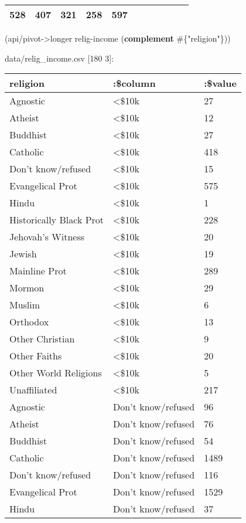 \documentclass[]{article}
\newenvironment{Shaded}{\begin{snugshade}}{\end{snugshade}}
\newcommand{\KeywordTok}[1]{\textcolor[rgb]{0.13,0.29,0.53}{\textbf{#1}}}
\newcommand{\StringTok}[1]{\textcolor[rgb]{0.31,0.60,0.02}{#1}}
\newcommand{\NormalTok}[1]{#1}
\begin{document}
\begin{longtable}[]{@{}lllllllllll@{}}
\begin{minipage}[t]{0.05\columnwidth}
528\strut
\end{minipage} & \begin{minipage}[t]{0.06\columnwidth}\raggedright\strut
407\strut
\end{minipage} & \begin{minipage}[t]{0.06\columnwidth}\raggedright\strut
321\strut
\end{minipage} & \begin{minipage}[t]{0.04\columnwidth}\raggedright\strut
258\strut
\end{minipage} & \begin{minipage}[t]{0.11\columnwidth}\raggedright\strut
597\strut
\end{minipage}\tabularnewline
\bottomrule
\end{longtable}

\begin{Shaded}
\begin{Highlighting}[]
\NormalTok{(api/pivot->longer relig-income (}\KeywordTok{complement}\NormalTok{ #\{}\StringTok{"religion"}\NormalTok{\}))}
\end{Highlighting}
\end{Shaded}

data/relig\_income.csv {[}180 3{]}:

\begin{longtable}[]{@{}lll@{}}
\toprule
religion & :\$column & :\$value\tabularnewline
\midrule
\endhead
Agnostic & \textless{}\$10k & 27\tabularnewline
Atheist & \textless{}\$10k & 12\tabularnewline
Buddhist & \textless{}\$10k & 27\tabularnewline
Catholic & \textless{}\$10k & 418\tabularnewline
Don't know/refused & \textless{}\$10k & 15\tabularnewline
Evangelical Prot & \textless{}\$10k & 575\tabularnewline
Hindu & \textless{}\$10k & 1\tabularnewline
Historically Black Prot & \textless{}\$10k & 228\tabularnewline
Jehovah's Witness & \textless{}\$10k & 20\tabularnewline
Jewish & \textless{}\$10k & 19\tabularnewline
Mainline Prot & \textless{}\$10k & 289\tabularnewline
Mormon & \textless{}\$10k & 29\tabularnewline
Muslim & \textless{}\$10k & 6\tabularnewline
Orthodox & \textless{}\$10k & 13\tabularnewline
Other Christian & \textless{}\$10k & 9\tabularnewline
Other Faiths & \textless{}\$10k & 20\tabularnewline
Other World Religions & \textless{}\$10k & 5\tabularnewline
Unaffiliated & \textless{}\$10k & 217\tabularnewline
Agnostic & Don't know/refused & 96\tabularnewline
Atheist & Don't know/refused & 76\tabularnewline
Buddhist & Don't know/refused & 54\tabularnewline
Catholic & Don't know/refused & 1489\tabularnewline
Don't know/refused & Don't know/refused & 116\tabularnewline
Evangelical Prot & Don't know/refused & 1529\tabularnewline
Hindu & Don't know/refused & 37\tabularnewline
\bottomrule
\end{longtable}
\end{document}
